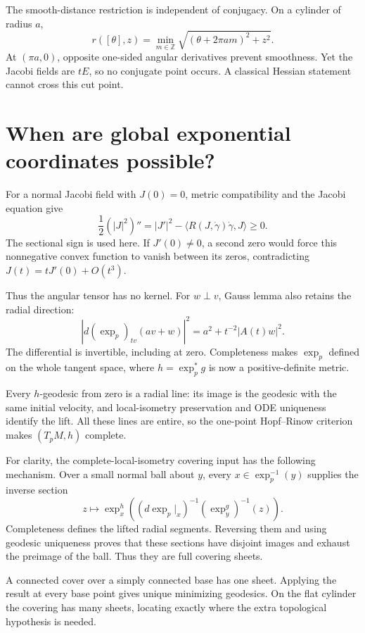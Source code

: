 \documentclass[12pt,reqno]{amsart}
\begin{document}
The smooth-distance restriction is independent of conjugacy. On a cylinder of radius \(a\),
\[
r([\theta],z)=\min_{m\in\mathbb Z}\sqrt{(\theta+2\pi am)^2+z^2}.
\]
At \((\pi a,0)\), opposite one-sided angular derivatives prevent smoothness. Yet the Jacobi fields are \(tE\), so no conjugate point occurs. A classical Hessian statement cannot cross this cut point.
\section{When are global exponential coordinates possible?}
\label{sec:hadamard}

\begin{samepage}
\begin{theorem}
\label{thm:hadamard}

\end{theorem}
\end{samepage}

For a normal Jacobi field with \(J(0)=0\), metric compatibility and the Jacobi equation give
\[
\frac12(|J|^2)''=|J'|^2-\langle R(J,\dot\gamma)\dot\gamma,J\rangle\ge0.
\]
The sectional sign is used here. If \(J'(0)\ne0\), a second zero would force this nonnegative convex function to vanish between its zeros, contradicting \(J(t)=tJ'(0)+O(t^3)\).

Thus the angular tensor has no kernel. For \(w\perp v\), Gauss lemma also retains the radial direction:
\[
|d(\exp_p)_{tv}(av+w)|^2=a^2+t^{-2}|A(t)w|^2.
\]
The differential is invertible, including at zero. Completeness makes \(\exp_p\) defined on the whole tangent space, where \(h=\exp_p^*g\) is now a positive-definite metric.

Every \(h\)-geodesic from zero is a radial line: its image is the geodesic with the same initial velocity, and local-isometry preservation and ODE uniqueness identify the lift. All these lines are entire, so the one-point Hopf--Rinow criterion makes \((T_pM,h)\) complete.

For clarity, the complete-local-isometry covering input has the following mechanism. Over a small normal ball about \(y\), every \(x\in\exp_p^{-1}(y)\) supplies the inverse section
\[
z\longmapsto\exp_x^h\left((d\exp_p|_x)^{-1}(\exp_y^g)^{-1}(z)\right).
\]
Completeness defines the lifted radial segments. Reversing them and using geodesic uniqueness proves that these sections have disjoint images and exhaust the preimage of the ball. Thus they are full covering sheets.

A connected cover over a simply connected base has one sheet. Applying the result at every base point gives unique minimizing geodesics. On the flat cylinder the covering has many sheets, locating exactly where the extra topological hypothesis is needed.
\end{document}
